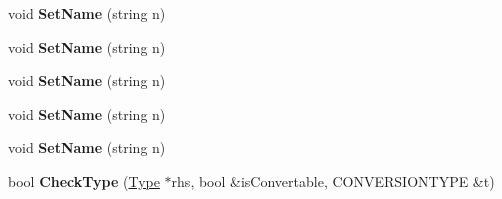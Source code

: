 \begin{DoxyCompactItemize}
\item 
\hypertarget{classType_ab8d2328a3a76289edf42b9bf0d4f278f}{void {\bfseries Set\-Name} (string n)}\label{classType_ab8d2328a3a76289edf42b9bf0d4f278f}

\item 
\hypertarget{classType_ab8d2328a3a76289edf42b9bf0d4f278f}{void {\bfseries Set\-Name} (string n)}\label{classType_ab8d2328a3a76289edf42b9bf0d4f278f}

\item 
\hypertarget{classType_ab8d2328a3a76289edf42b9bf0d4f278f}{void {\bfseries Set\-Name} (string n)}\label{classType_ab8d2328a3a76289edf42b9bf0d4f278f}

\item 
\hypertarget{classType_ab8d2328a3a76289edf42b9bf0d4f278f}{void {\bfseries Set\-Name} (string n)}\label{classType_ab8d2328a3a76289edf42b9bf0d4f278f}

\item 
\hypertarget{classType_ab8d2328a3a76289edf42b9bf0d4f278f}{void {\bfseries Set\-Name} (string n)}\label{classType_ab8d2328a3a76289edf42b9bf0d4f278f}

\item 
\hypertarget{classType_a2574b17ddc03d5ca13309811d06f1a56}{bool {\bfseries Check\-Type} (\hyperlink{classType}{Type} $\ast$rhs, bool \&is\-Convertable, C\-O\-N\-V\-E\-R\-S\-I\-O\-N\-T\-Y\-P\-E \&t)}\label{classType_a2574b17ddc03d5ca13309811d06f1a56}

\end{DoxyCompactItemize}
